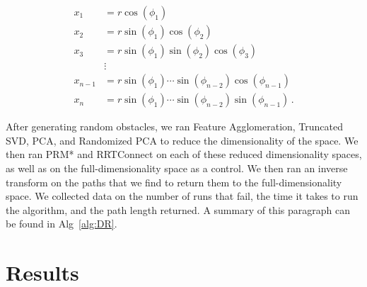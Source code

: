 \documentclass[12pt]{article}
\begin{document}
\begin{align*}
x_1 &= r \cos(\phi_1) \\
x_2 &= r \sin(\phi_1) \cos(\phi_2) \\
x_3 &= r \sin(\phi_1) \sin(\phi_2) \cos(\phi_3) \\
    &\vdots\\
x_{n-1} &= r \sin(\phi_1) \cdots \sin(\phi_{n-2}) \cos(\phi_{n-1}) \\
x_n &= r \sin(\phi_1) \cdots \sin(\phi_{n-2}) \sin(\phi_{n-1}) \,.
\end{align*}

After generating random obstacles, we ran Feature Agglomeration, Truncated SVD,
PCA, and Randomized PCA to reduce the dimensionality of the space. We then ran
PRM* and RRTConnect on each of these reduced dimensionality spaces, as well as
on the full-dimensionality space as a control. We then ran an inverse transform
on the paths that we find to return them to the full-dimensionality space. We
collected data on the number of runs that fail, the time it takes to run the
algorithm, and the path length returned. A summary of this paragraph can be
found in Alg~\ref{alg:DR}. 

\section{Results}
\end{document}
